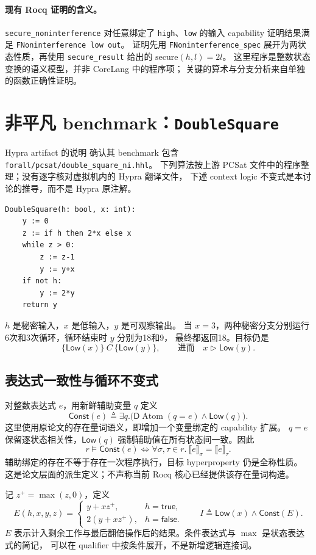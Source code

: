 \documentclass[UTF8,a4paper,11pt,fontset=fandol]{ctexart}
\newcommand{\Atom}{\operatorname{Atom}}
\newcommand{\Low}{\mathsf{Low}}
\newcommand{\Const}{\mathsf{Const}}
\newcommand{\D}{\mathsf{D}}
\newcommand{\true}{\mathsf{true}}
\newcommand{\false}{\mathsf{false}}
\newcommand{\sat}{\models}
\newcommand{\eqv}{\Longleftrightarrow}
\begin{document}
\paragraph{现有 Rocq 证明的含义。}
\texttt{secure\_noninterference} 对任意绑定了 \texttt{high}、\texttt{low} 的输入 capability
证明结果满足 \texttt{FNoninterference low out}。
证明先用 \texttt{FNoninterference\_spec} 展开为两状态性质，再使用
\texttt{secure\_result} 给出的 $\mathrm{secure}(h,l)=2l$。
这里程序是整数状态变换的语义模型，并非 CoreLang 中的程序项；
关键的算术与分支分析来自单独的函数正确性证明。

\section{非平凡 benchmark：\texttt{DoubleSquare}}

Hypra artifact 的说明\cite{artifact} 确认其 benchmark 包含
\texttt{forall/pcsat/double\_square\_ni.hhl}。
下列算法按上游 PCSat 文件中的程序整理\cite{pcsat}；没有逐字核对虚拟机内的 Hypra 翻译文件，
下述 context logic 不变式是本讨论的推导，而不是 Hypra 原注解。
\begin{verbatim}
DoubleSquare(h: bool, x: int):
    y := 0
    z := if h then 2*x else x
    while z > 0:
        z := z-1
        y := y+x
    if not h:
        y := 2*y
    return y
\end{verbatim}
$h$ 是秘密输入，$x$ 是低输入，$y$ 是可观察输出。
当 $x=3$，两种秘密分支分别运行6次和3次循环，循环结束时 $y$ 分别为18和9，
最终都返回18。目标仍是
\[
 \{\Low(x)\}\ C\ \{\Low(y)\},
 \qquad\text{进而}\quad x\triangleright\Low(y).
\]

\subsection{表达式一致性与循环不变式}
对整数表达式 $e$，用新鲜辅助变量 $q$ 定义
\[
 \Const(e)\triangleq
 \exists q.\bigl(\D\Atom(q=e)\land\Low(q)\bigr).
\]
这里使用原论文的存在量词语义，即增加一个变量绑定的 capability 扩展。
$q=e$ 保留逐状态相关性，$\Low(q)$ 强制辅助值在所有状态间一致。因此
\[
 r\sat\Const(e)\eqv
 \forall\sigma,\tau\in r.\
 \llbracket e\rrbracket_\sigma=\llbracket e\rrbracket_\tau.
\]
辅助绑定的存在不等于存在一次程序执行，目标 hyperproperty 仍是全称性质。
这是论文层面的派生定义；不声称当前 Rocq 核心已经提供该存在量词构造。

记 $z^+=\max(z,0)$，定义
\[
 E(h,x,y,z)=
 \begin{cases}
 y+xz^+, &h=\true,\\
 2(y+xz^+), &h=\false.
 \end{cases}
 \qquad
 \boxed{I\triangleq\Low(x)\land\Const(E).}
\]
$E$ 表示计入剩余工作与最后翻倍操作后的结果。条件表达式与 $\max$ 是状态表达式的简记，
可以在 qualifier 中按条件展开，不是新增逻辑连接词。
\end{document}
